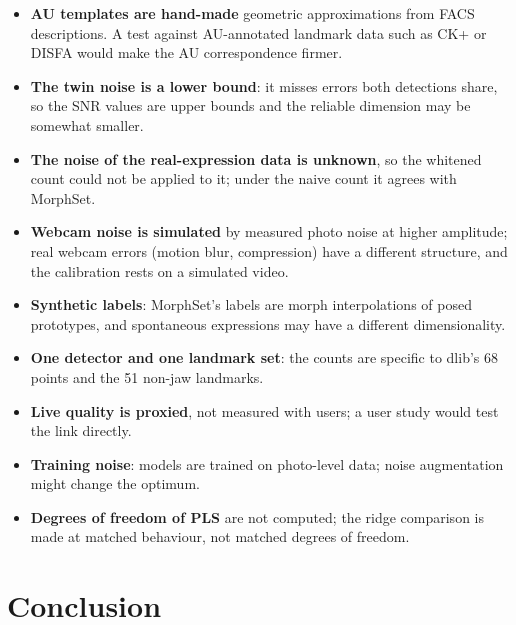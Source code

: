 \documentclass[11pt,a4paper]{article}
\begin{document}
\begin{itemize}
  \item \textbf{AU templates are hand-made} geometric approximations from FACS descriptions. A test
  against AU-annotated landmark data such as CK+ \citep{lucey2010ckplus} or DISFA
  \citep{mavadati2013disfa} would make the AU correspondence firmer.
  \item \textbf{The twin noise is a lower bound}: it misses errors both detections share, so the
  SNR values are upper bounds and the reliable dimension may be somewhat smaller.
  \item \textbf{The noise of the real-expression data is unknown}, so the whitened count could not
  be applied to it; under the naive count it agrees with MorphSet.
  \item \textbf{Webcam noise is simulated} by measured photo noise at higher amplitude; real webcam
  errors (motion blur, compression) have a different structure, and the calibration rests on a
  simulated video.
  \item \textbf{Synthetic labels}: MorphSet's labels are morph interpolations of posed prototypes,
  and spontaneous expressions may have a different dimensionality.
  \item \textbf{One detector and one landmark set}: the counts are specific to dlib's 68 points and
  the 51 non-jaw landmarks.
  \item \textbf{Live quality is proxied}, not measured with users; a user study would test the link
  directly.
  \item \textbf{Training noise}: models are trained on photo-level data; noise augmentation might
  change the optimum.
  \item \textbf{Degrees of freedom of PLS} are not computed; the ridge comparison is made at matched
  behaviour, not matched degrees of freedom.
\end{itemize}

\section{Conclusion}
\end{document}
